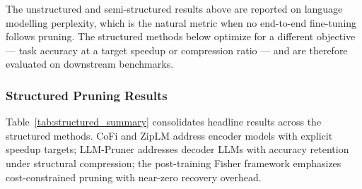 The unstructured and semi-structured results above are reported on language modelling perplexity, which is the natural metric when no end-to-end fine-tuning follows pruning. The structured methods below optimize for a different objective — task accuracy at a target speedup or compression ratio — and are therefore evaluated on downstream benchmarks.

\subsubsection{Structured Pruning Results}

Table~\ref{tab:structured_summary} consolidates headline results across the structured methods. CoFi and ZipLM address encoder models with explicit speedup targets; LLM-Pruner addresses decoder LLMs with accuracy retention under structural compression; the post-training Fisher framework emphasizes cost-constrained pruning with near-zero recovery overhead.

